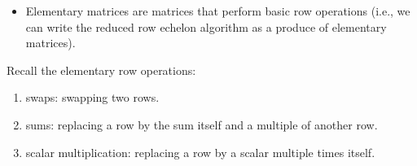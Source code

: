 \documentclass[
]{book}
\providecommand{\tightlist}{%
  \setlength{\itemsep}{0pt}\setlength{\parskip}{0pt}}
\theoremstyle{definition}
\theoremstyle{definition}
\theoremstyle{definition}
\theoremstyle{remark}
\begin{document}
\begin{itemize}
\tightlist
\item
  Elementary matrices are matrices that perform basic row operations (i.e., we can write the reduced row echelon algorithm as a produce of elementary matrices).
\end{itemize}

Recall the elementary row operations:

\begin{enumerate}
\def\labelenumi{\arabic{enumi})}
\tightlist
\item
  swaps: swapping two rows.
\item
  sums: replacing a row by the sum itself and a multiple of another row.
\item
  scalar multiplication: replacing a row by a scalar multiple times itself.
\end{enumerate}
\end{document}
